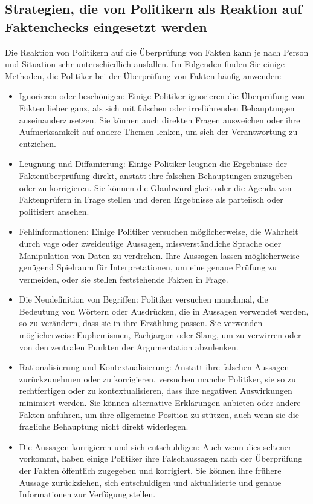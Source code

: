 \documentclass[a4paper,listof=totoc,bibliography=totoc]{scrartcl}
\begin{document}
\subsection{Strategien, die von Politikern als Reaktion auf Faktenchecks eingesetzt werden}
Die Reaktion von Politikern auf die Überprüfung von Fakten kann je nach Person und Situation sehr unterschiedlich ausfallen. Im Folgenden finden Sie einige Methoden, die 
Politiker bei der Überprüfung von Fakten häufig anwenden:

\begin{itemize}
    \item Ignorieren oder beschönigen:  Einige Politiker ignorieren die Überprüfung von Fakten lieber ganz, als sich mit falschen oder irreführenden Behauptungen 
    auseinanderzusetzen. Sie können auch direkten Fragen ausweichen oder ihre Aufmerksamkeit auf andere Themen lenken, um sich der Verantwortung zu entziehen. 
    \item Leugnung und Diffamierung: Einige Politiker leugnen die Ergebnisse der Faktenüberprüfung direkt, anstatt ihre falschen Behauptungen zuzugeben oder zu korrigieren. 
    Sie können die Glaubwürdigkeit oder die Agenda von Faktenprüfern in Frage stellen und deren Ergebnisse als parteiisch oder politisiert ansehen. 
    \item Fehlinformationen: Einige Politiker versuchen möglicherweise, die Wahrheit durch vage oder zweideutige Aussagen, missverständliche Sprache oder Manipulation von 
    Daten zu verdrehen. Ihre Aussagen lassen möglicherweise genügend Spielraum für Interpretationen, um eine genaue Prüfung zu vermeiden, oder sie stellen feststehende Fakten in Frage.
    \item Die Neudefinition von Begriffen: Politiker versuchen manchmal, die Bedeutung von Wörtern oder Ausdrücken, die in Aussagen verwendet werden, so zu verändern, 
    dass sie in ihre Erzählung passen. Sie verwenden möglicherweise Euphemismen, Fachjargon oder Slang, um zu verwirren oder von den zentralen Punkten der Argumentation abzulenken. 
    \item Rationalisierung und Kontextualisierung: Anstatt ihre falschen Aussagen zurückzunehmen oder zu korrigieren, versuchen manche Politiker, sie so zu rechtfertigen 
    oder zu kontextualisieren, dass ihre negativen Auswirkungen minimiert werden. Sie können alternative Erklärungen anbieten oder andere Fakten anführen, um ihre allgemeine 
    Position zu stützen, auch wenn sie die fragliche Behauptung nicht direkt widerlegen. 
    \item Die Aussagen korrigieren und sich entschuldigen: Auch wenn dies seltener vorkommt, haben einige Politiker ihre Falschaussagen nach der Überprüfung der Fakten öffentlich 
    zugegeben und korrigiert. Sie können ihre frühere Aussage zurückziehen, sich entschuldigen und aktualisierte und genaue Informationen zur Verfügung stellen. 
\end{itemize}
\end{document}
